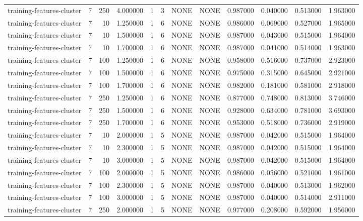 \begin{tabular}{lrrrllllrrrr}
training-features-cluster & 7 & 250 & 4.000000 & 1 & 3 & NONE & NONE & 0.987000 & 0.040000 & 0.513000 & 1.963000 \\
training-features-cluster & 7 & 10 & 1.250000 & 1 & 6 & NONE & NONE & 0.986000 & 0.069000 & 0.527000 & 1.965000 \\
training-features-cluster & 7 & 10 & 1.500000 & 1 & 6 & NONE & NONE & 0.987000 & 0.043000 & 0.515000 & 1.964000 \\
training-features-cluster & 7 & 10 & 1.700000 & 1 & 6 & NONE & NONE & 0.987000 & 0.041000 & 0.514000 & 1.963000 \\
training-features-cluster & 7 & 100 & 1.250000 & 1 & 6 & NONE & NONE & 0.958000 & 0.516000 & 0.737000 & 2.923000 \\
training-features-cluster & 7 & 100 & 1.500000 & 1 & 6 & NONE & NONE & 0.975000 & 0.315000 & 0.645000 & 2.921000 \\
training-features-cluster & 7 & 100 & 1.700000 & 1 & 6 & NONE & NONE & 0.982000 & 0.181000 & 0.581000 & 2.918000 \\
training-features-cluster & 7 & 250 & 1.250000 & 1 & 6 & NONE & NONE & 0.877000 & 0.748000 & 0.813000 & 3.746000 \\
training-features-cluster & 7 & 250 & 1.500000 & 1 & 6 & NONE & NONE & 0.928000 & 0.634000 & 0.781000 & 3.693000 \\
training-features-cluster & 7 & 250 & 1.700000 & 1 & 6 & NONE & NONE & 0.953000 & 0.518000 & 0.736000 & 2.919000 \\
training-features-cluster & 7 & 10 & 2.000000 & 1 & 5 & NONE & NONE & 0.987000 & 0.042000 & 0.515000 & 1.964000 \\
training-features-cluster & 7 & 10 & 2.300000 & 1 & 5 & NONE & NONE & 0.987000 & 0.042000 & 0.515000 & 1.964000 \\
training-features-cluster & 7 & 10 & 3.000000 & 1 & 5 & NONE & NONE & 0.987000 & 0.042000 & 0.515000 & 1.964000 \\
training-features-cluster & 7 & 100 & 2.000000 & 1 & 5 & NONE & NONE & 0.986000 & 0.056000 & 0.521000 & 1.961000 \\
training-features-cluster & 7 & 100 & 2.300000 & 1 & 5 & NONE & NONE & 0.987000 & 0.040000 & 0.513000 & 1.962000 \\
training-features-cluster & 7 & 100 & 3.000000 & 1 & 5 & NONE & NONE & 0.987000 & 0.040000 & 0.514000 & 2.911000 \\
training-features-cluster & 7 & 250 & 2.000000 & 1 & 5 & NONE & NONE & 0.977000 & 0.208000 & 0.592000 & 1.956000 \\

\end{tabular}
